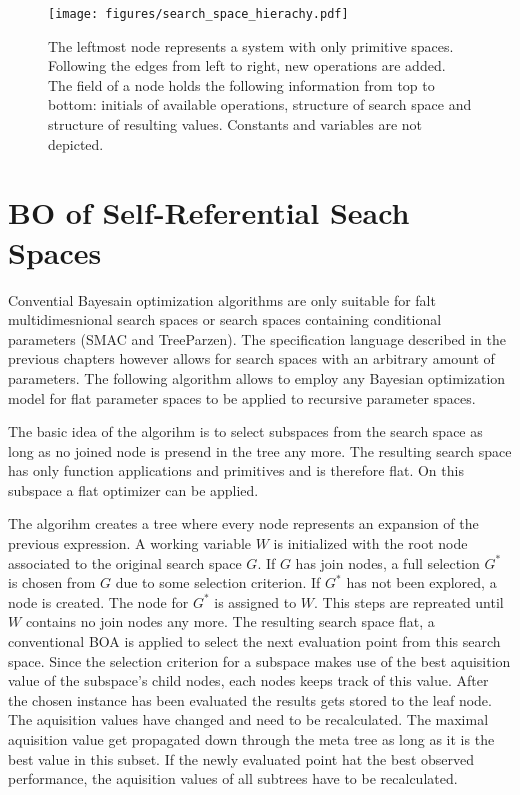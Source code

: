 \documentclass[english]{article}
\begin{document}
\begin{figure}
\texttt{[image: figures/search\_space\_hierachy.pdf]}

  \caption{The leftmost node represents a system with only primitive spaces. Following the edges from left to right, new operations are added. The field of a node holds the following information from top to bottom: initials of available operations, structure of search space and structure of resulting values. Constants and variables are not depicted.}
  \label{space_structure}
\end{figure}


\section{BO of Self-Referential Seach Spaces}

Convential Bayesain optimization algorithms are only suitable for falt multidimesnional search spaces or search spaces containing conditional parameters (SMAC and TreeParzen). The specification language described in the previous chapters however allows for search spaces with an arbitrary amount of parameters. The following algorithm allows to employ any Bayesian optimization model for flat parameter spaces to be applied to recursive parameter spaces.

The basic idea of the algorihm is to select subspaces from the search space as long as no joined node is presend in the tree any more. The resulting search space has only function applications and primitives and is therefore flat. On this subspace a flat optimizer can be applied.

The algorihm creates a tree where every node represents an expansion of the previous expression. A working variable $W$ is initialized with the root node associated to the original search space $G$. If $G$ has join nodes, a full selection $G^*$ is chosen from $G$ due to some selection criterion. If $G^*$ has not been explored, a node is created. The node for $G^*$ is assigned to $W$. This steps are repreated until $W$ contains no join nodes any more. The resulting search space flat, a conventional \ac{BOA} is applied to select the next evaluation point from this search space. Since the selection criterion for a subspace makes use of the best aquisition value of the subspace's child nodes, each nodes keeps track of this value. After the chosen instance has been evaluated the results gets stored to the leaf node. The aquisition values have changed and need to be recalculated. The maximal aquisition value get propagated down through the meta tree as long as it is the best value in this subset. If the newly evaluated point hat the best observed performance, the aquisition values of all subtrees have to be recalculated.
\end{document}
